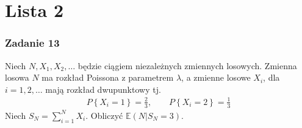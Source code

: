 \chapter*{Lista 2}


\subsection*{Zadanie 13}
Niech $ N,X_1,X_2,\dots$ będzie ciągiem niezależnych zmiennych losowych. Zmienna losowa $ N $ ma rozkład Poissona z parametrem $ \lambda $, a zmienne losowe $ X_i $, dla $ i=1,2,\dots$ mają rozkład dwupunktowy tj.
\begin{gather*}
P\left\{X_i=1\right\}=\frac{2}{3},\qquad P\left\{X_i=2\right\}=\frac{1}{3}
\end{gather*}
Niech $ S_N=\sum_{i=1}^{N}X_i $. Obliczyć $ \mathbb E \left(N|S_N=3\right) $.

